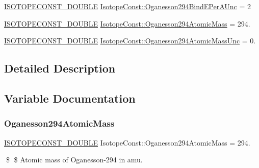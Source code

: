 \begin{DoxyCompactItemize}
\mbox{\hyperlink{group___isotope_const-_macros_ga8f45a7272ce02c0b4c65c44636ed719a}{I\+S\+O\+T\+O\+P\+E\+C\+O\+N\+S\+T\+\_\+\+D\+O\+U\+B\+LE}} \mbox{\hyperlink{group___isotope_const-_oganesson-_og294_gaa5a780960b2a4d53253eb8c420e39826}{Isotope\+Const\+::\+Oganesson294\+Bind\+E\+Per\+A\+Unc}} = 2
\item 
\mbox{\hyperlink{group___isotope_const-_macros_ga8f45a7272ce02c0b4c65c44636ed719a}{I\+S\+O\+T\+O\+P\+E\+C\+O\+N\+S\+T\+\_\+\+D\+O\+U\+B\+LE}} \mbox{\hyperlink{group___isotope_const-_oganesson-_og294_ga7e3a66b99b61e6dacf4c468031d8a1b3}{Isotope\+Const\+::\+Oganesson294\+Atomic\+Mass}} = 294.
\item 
\mbox{\hyperlink{group___isotope_const-_macros_ga8f45a7272ce02c0b4c65c44636ed719a}{I\+S\+O\+T\+O\+P\+E\+C\+O\+N\+S\+T\+\_\+\+D\+O\+U\+B\+LE}} \mbox{\hyperlink{group___isotope_const-_oganesson-_og294_gaf9ac3ff24aca6463fc3baa8be3b5ff32}{Isotope\+Const\+::\+Oganesson294\+Atomic\+Mass\+Unc}} = 0.
\end{DoxyCompactItemize}


\subsection{Detailed Description}


\subsection{Variable Documentation}
\mbox{\label{group___isotope_const-_oganesson-_og294_ga7e3a66b99b61e6dacf4c468031d8a1b3}} 
\subsubsection{\texorpdfstring{Oganesson294\+Atomic\+Mass}{Oganesson294AtomicMass}}
{\footnotesize\ttfamily \mbox{\hyperlink{group___isotope_const-_macros_ga8f45a7272ce02c0b4c65c44636ed719a}{I\+S\+O\+T\+O\+P\+E\+C\+O\+N\+S\+T\+\_\+\+D\+O\+U\+B\+LE}} Isotope\+Const\+::\+Oganesson294\+Atomic\+Mass = 294.}

\$ \$ Atomic mass of Oganesson-\/294 in amu. \mbox{\label{group___isotope_const-_oganesson-_og294_gaf9ac3ff24aca6463fc3baa8be3b5ff32}} 
